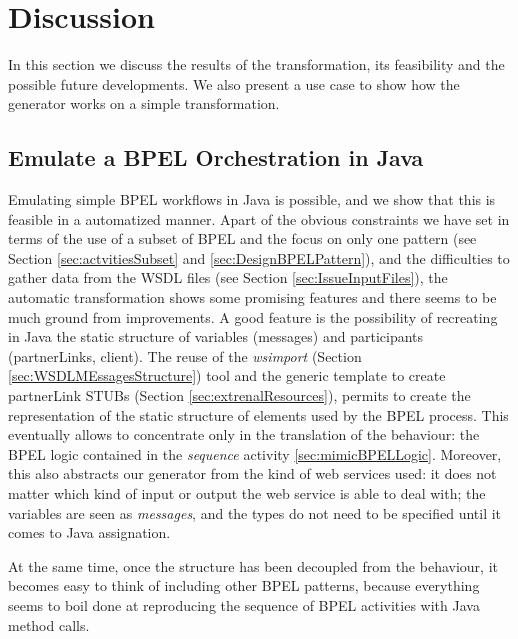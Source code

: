 \section{Discussion}
\label{Discussion}
In this section we discuss the results of the transformation, its feasibility and the possible future developments. We also present a use case to show how the generator works on a simple transformation.
\subsection{Emulate a BPEL Orchestration in Java}
\label{sec:OrchestrEmulation}
Emulating simple BPEL workflows in Java is possible, and we show that this is feasible in a automatized manner. Apart of the obvious constraints we have set in terms of the use of a subset of BPEL and the focus on only one pattern (see Section \ref{sec:actvitiesSubset} and \ref{sec:DesignBPELPattern}), and the difficulties to gather data from the WSDL files (see Section \ref{sec:IssueInputFiles}), the automatic transformation shows some promising features and there seems to be much ground from improvements.
A good feature is the possibility of recreating in Java the static structure of variables (messages) and participants (partnerLinks, client). The reuse of the \textit{wsimport} (Section \ref{sec:WSDLMEssagesStructure}) tool and the generic template to create partnerLink STUBs (Section \ref{sec:extrenalResources}), permits to create the representation of the static structure of elements used by the BPEL process. This eventually allows to concentrate only in the translation of the behaviour: the BPEL logic contained in the \textit{sequence} activity \ref{sec:mimicBPELLogic}. Moreover, this also abstracts our generator from the kind of web services used: it does not matter which kind of input or output the web service is able to deal with; the variables are seen as \textit{messages}, and the types do not need to be specified until it comes to Java assignation.

At the same time, once the structure has been decoupled from the behaviour, it becomes easy to think of including other BPEL patterns, because everything seems to boil done at reproducing the sequence of BPEL activities with Java method calls. 


